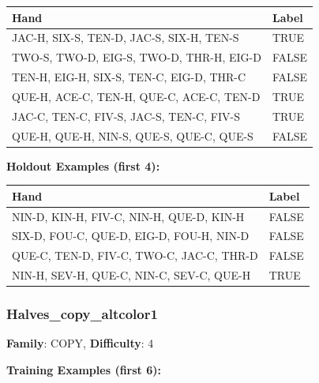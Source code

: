 \documentclass[10pt,a4paper]{article}
\begin{document}
\begin{small}
\begin{tabular}{p{8cm}l}
\toprule
Hand & Label \\
\midrule
JAC-H, SIX-S, TEN-D, JAC-S, SIX-H, TEN-S & \textcolor{positive}{TRUE} \\
TWO-S, TWO-D, EIG-S, TWO-D, THR-H, EIG-D & \textcolor{negative}{FALSE} \\
TEN-H, EIG-H, SIX-S, TEN-C, EIG-D, THR-C & \textcolor{negative}{FALSE} \\
QUE-H, ACE-C, TEN-H, QUE-C, ACE-C, TEN-D & \textcolor{positive}{TRUE} \\
JAC-C, TEN-C, FIV-S, JAC-S, TEN-C, FIV-S & \textcolor{positive}{TRUE} \\
QUE-H, QUE-H, NIN-S, QUE-S, QUE-C, QUE-S & \textcolor{negative}{FALSE} \\
\bottomrule
\end{tabular}
\end{small}

\textbf{Holdout Examples (first 4):}

\begin{small}
\begin{tabular}{p{8cm}l}
\toprule
Hand & Label \\
\midrule
NIN-D, KIN-H, FIV-C, NIN-H, QUE-D, KIN-H & \textcolor{negative}{FALSE} \\
SIX-D, FOU-C, QUE-D, EIG-D, FOU-H, NIN-D & \textcolor{negative}{FALSE} \\
QUE-C, TEN-D, FIV-C, TWO-C, JAC-C, THR-D & \textcolor{negative}{FALSE} \\
NIN-H, SEV-H, QUE-C, NIN-C, SEV-C, QUE-H & \textcolor{positive}{TRUE} \\
\bottomrule
\end{tabular}
\end{small}

\vspace{0.5cm}

\subsubsection{Halves\_copy\_altcolor1}

\textbf{Family}: COPY, \textbf{Difficulty}: 4

\textbf{Training Examples (first 6):}
\end{document}
